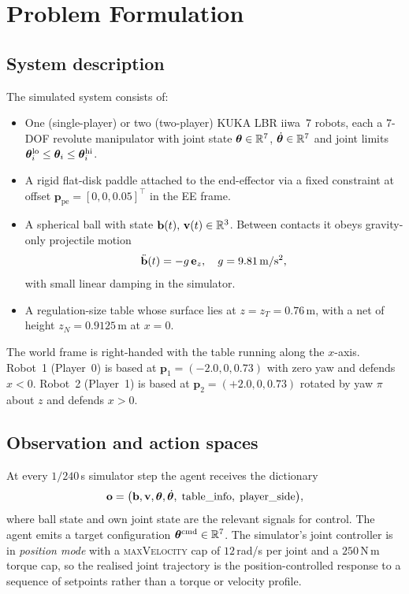 \section{Problem Formulation}
\label{sec:problem}

\subsection{System description}

The simulated system consists of:
\begin{itemize}
  \item One (single-player) or two (two-player) KUKA LBR iiwa~7 robots,
        each a 7-DOF revolute manipulator with joint state
        $\boldsymbol{\theta}\in\mathbb{R}^{7}$, $\dot{\boldsymbol{\theta}}\in\mathbb{R}^{7}$ and joint limits
        $\boldsymbol{\theta}^{\mathrm{lo}}_{i}\le\boldsymbol{\theta}_{i}\le\boldsymbol{\theta}^{\mathrm{hi}}_{i}$.
  \item A rigid flat-disk paddle attached to the end-effector via a fixed
        constraint at offset $\mathbf{p}_{\mathrm{pe}}=[0,0,0.05]^{\!\top}$
        in the EE frame.
  \item A spherical ball with state
        $\mathbf{b}(t),\,\mathbf{v}(t)\in\mathbb{R}^{3}$.
        Between contacts it obeys gravity-only projectile motion
        \begin{equation}
          \ddot{\mathbf{b}}(t)=-g\,\mathbf{e}_{z},\quad g=9.81\,\mathrm{m/s^{2}},
          \label{eq:gravity}
        \end{equation}
        with small linear damping in the simulator.
  \item A regulation-size table whose surface lies at
        $z=z_{T}=0.76\,\mathrm{m}$, with a net of height
        $z_{N}=0.9125\,\mathrm{m}$ at $x=0$.
\end{itemize}

The world frame is right-handed with the table running along the $x$-axis.
Robot~1 (Player~0) is based at $\mathbf{p}_{1}=(-2.0,0,0.73)$ with zero
yaw and defends $x<0$. Robot~2 (Player~1) is based at
$\mathbf{p}_{2}=(+2.0,0,0.73)$ rotated by yaw $\pi$ about $z$ and defends
$x>0$.

\subsection{Observation and action spaces}

At every $1/240$\,s simulator step the agent receives the dictionary
\[
  \mathbf{o}=\bigl(\mathbf{b},\mathbf{v},\boldsymbol{\theta},\dot{\boldsymbol{\theta}},\;\text{table\_info},\;\text{player\_side}\bigr),
\]
where ball state and own joint state are the relevant signals for control.
The agent emits a target configuration $\boldsymbol{\theta}^{\mathrm{cmd}}\in\mathbb{R}^{7}$.
The simulator's joint controller is in \emph{position mode} with a
\textsc{maxVelocity} cap of $12$\,rad/s per joint and a
$250$\,N$\,$m torque cap, so the realised joint trajectory is the
position-controlled response to a sequence of setpoints rather than a
torque or velocity profile.

